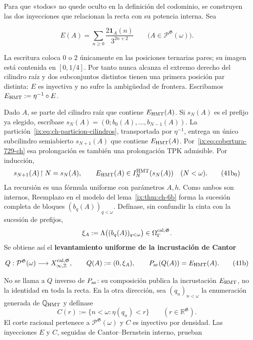 Para que «todos» no quede oculto en la definición del codominio, se construyen
las dos inyecciones que relacionan la recta con su potencia interna. Sea

\[
 E(A)=\sum_{n\ge0}\frac{2\mathbf1_A(n)}{3^{2n+2}}
 \qquad
 \bigl(A\in\mathcal P^{\mathfrak G}(\omega)\bigr).
\tag{41a}\label{ix:eq:ch-incrustacion-cantor}
\]

La escritura coloca \(0\) o \(2\) únicamente en las posiciones ternarias
pares; su imagen está contenida en \([0,1/4]\). Por tanto nunca alcanza el
extremo derecho del cilindro raíz y dos subconjuntos distintos tienen una
primera posición par distinta: \(E\) es inyectiva y no sufre la ambigüedad de
frontera. Escribamos \(E_{\rm HMT}:=\eta^{-1}\circ E\).

Dado \(A\), se parte del cilindro raíz que contiene \(E_{\rm HMT}(A)\). Si
\(s_N(A)\) es el prefijo ya elegido, escríbase
\(s_N(A)=(0;b_0(A),\ldots,b_{N-1}(A))\). La partición~\eqref{ix:eq:ch-particion-cilindros}, transportada
por \(\eta^{-1}\), entrega un único subcilindro semiabierto
\(s_{N+1}(A)\) que contiene \(E_{\rm HMT}(A)\). Por~\eqref{ix:eq:cobertura-729-ch} esa prolongación es
también una prolongación TPK admisible. Por inducción,
\[
 s_{N+1}(A)\!\upharpoonright N=s_N(A),\qquad
 E_{\rm HMT}(A)\in I_N^{\rm HMT}(s_N(A))\quad(N<\omega).
\tag{41b$_0$}\label{ix:eq:ch-prefijos-uniformes}
\]
La recursión es una fórmula uniforme con parámetros \(A,h\). Como ambos son
internos, Reemplazo en el modelo del lema~\ref{ix:thm:ch-6b} forma la sucesión completa de
bloques \((b_q(A))_{q<\omega}\). Defínase, sin confundir la cinta con la
sucesión de prefijos,
\[
 \xi_A:=\Lambda\bigl((b_q(A))_{q<\omega}\bigr)
 \in\Omega_\Gamma^{\rm cal,\mathfrak G}.
\]
Se obtiene así el \textbf{levantamiento uniforme de la incrustación de Cantor}

\[
 Q:\mathcal P^{\mathfrak G}(\omega)
 \longrightarrow X_{\infty,\mathbb Z}^{\rm cal,\mathfrak G},
 \qquad
 Q(A):=(0,\xi_A),\qquad
 P_{\rm ar}(Q(A))=E_{\rm HMT}(A).
\tag{41b}\label{ix:eq:ch-levantamiento-uniforme}
\]

No se llama a \(Q\) inverso de \(P_{\rm ar}\): su composición publica la
incrustación \(E_{\rm HMT}\), no la identidad en toda la recta. En la otra
dirección, sea \((q_n)_{n<\omega}\) la enumeración generada de
\(\mathbb Q_{\rm HMT}\) y defínase
\[
 C(r):=\{n<\omega:\eta(q_n)<r\}
 \qquad(r\in\mathbb R^{\mathfrak G}).
\]
El corte racional pertenece a \(\mathcal P^{\mathfrak G}(\omega)\) y
\(C\) es inyectivo por densidad. Las inyecciones \(E\) y \(C\), seguidas de
Cantor--Bernstein interno, prueban

